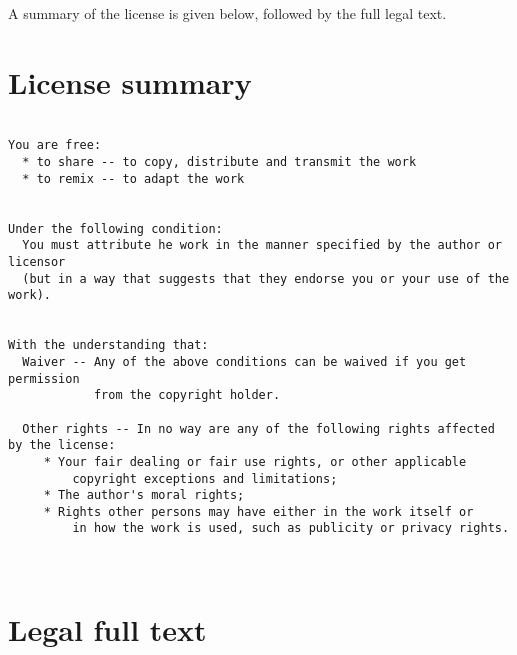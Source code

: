 \documentclass[10pt,A4]{book}
\begin{document}
A summary of the license is given below, followed by the full legal text.

\section{License summary}

\begin{verbatim}

You are free:
  * to share -- to copy, distribute and transmit the work
  * to remix -- to adapt the work


Under the following condition:
  You must attribute he work in the manner specified by the author or licensor
  (but in a way that suggests that they endorse you or your use of the work).


With the understanding that:
  Waiver -- Any of the above conditions can be waived if you get permission
            from the copyright holder.
  
  Other rights -- In no way are any of the following rights affected by the license:
     * Your fair dealing or fair use rights, or other applicable 
         copyright exceptions and limitations;
     * The author's moral rights;
     * Rights other persons may have either in the work itself or
         in how the work is used, such as publicity or privacy rights.



\end{verbatim}



\section{Legal full text}
\end{document}
